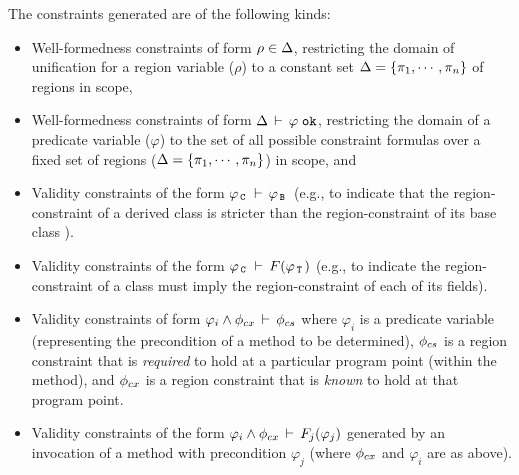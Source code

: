 The constraints generated are of the following kinds:
\begin{itemize}

\item Well-formedness constraints of form $\rho \in \Delta$,
restricting the domain of unification for a region variable ($\rho$)
to a constant set $\Delta = \{ \pi_1, \cdots, \pi_n \}$ of regions in scope,

\item Well-formedness constraints of form $\Delta\,\vdash\,\varphi \; \texttt{ok}$, restricting the domain of a predicate
variable ($\varphi$) to the set of all possible constraint formulas over a fixed set of 
regions ($\Delta = \{ \pi_1, \cdots, \pi_n \}$) in scope, and

\item Validity constraints of the form $\varphi_{\,{\tt C}\,}\,\vdash\,\varphi_{\,{\tt B}\,}$
  (e.g., to indicate that the region-constraint of a derived class  is stricter than
  the region-constraint of its base class ).

\item Validity constraints of the form $\varphi_{\,{\tt C}\,}\,\vdash\,{F(\varphi_{\,{\tt T}\,})}$
  (e.g., to indicate the region-constraint of a class  must imply the
  region-constraint of each of its fields).

\item Validity constraints of form $\varphi_i \wedge \phi_{cx}\,\vdash\,\phi_{cs}$
where $\varphi_i$ is a predicate variable (representing the precondition of a
method to be determined), $\phi_{cs}$ is a region constraint that is \emph{required}
to hold at a particular program point (within the method), and $\phi_{cx}$ is
a region constraint that is \emph{known} to hold at that program point.

%
%

\item Validity constraints of the form $\varphi_i \wedge \phi_{cx}\,\vdash\,F_j(\varphi_j)$
generated by an invocation of a method with precondition $\varphi_j$ (where $\phi_{cx}$ and
$\varphi_i$ are as above).

\end{itemize}


